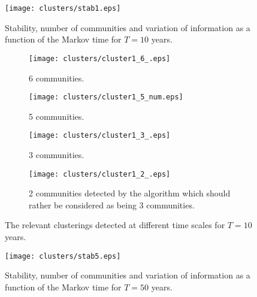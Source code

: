 
\begin{figure}[H]
	\centering
	\texttt{[image: clusters/stab1.eps]}
	\caption{Stability, number of communities and variation of information as a function of the Markov time for $T=10$ years.}
	\label{fig:stab1}
\end{figure}

\begin{figure}[H]
	\centering
	\begin{subfigure}[t]{0.49\textwidth}
		\texttt{[image: clusters/cluster1\_6\_.eps]}
		\caption{6 communities.}
		\label{fig:cluster1_6_}
	\end{subfigure}
	\begin{subfigure}[t]{0.49\textwidth}
		\texttt{[image: clusters/cluster1\_5\_num.eps]}
		\caption{5 communities.}
		\label{fig:cluster1_5_}
	\end{subfigure}
	\begin{subfigure}[t]{0.49\textwidth}
		\texttt{[image: clusters/cluster1\_3\_.eps]}
		\caption{3 communities.}
		\label{fig:cluster1_3_}
	\end{subfigure}
	\begin{subfigure}[t]{0.49\textwidth}
		\texttt{[image: clusters/cluster1\_2\_.eps]}
		\caption{2 communities detected by the algorithm which should rather be considered as being 3 communities.}
		\label{fig:cluster1_2_}
	\end{subfigure}
	\caption{The relevant clusterings detected at different time scales for $T=10$ years.}
	\label{fig:cluster1}
\end{figure}

\begin{figure}[H]
	\centering
	\texttt{[image: clusters/stab5.eps]}
	\caption{Stability, number of communities and variation of information as a function of the Markov time for $T=50$ years.}
	\label{fig:stab5}
\end{figure}

